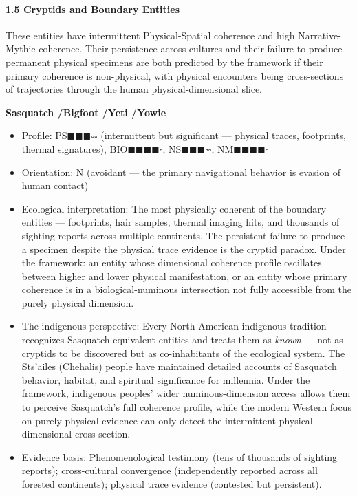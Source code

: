 \paragraph*{1.5 Cryptids and Boundary Entities}


These entities have intermittent Physical-Spatial coherence and high Narrative-Mythic coherence. Their persistence across cultures and their failure to produce permanent physical specimens are both predicted by the framework if their primary coherence is non-physical, with physical encounters being cross-sections of trajectories through the human physical-dimensional slice.


\textbf{Sasquatch /\allowbreak  Bigfoot /\allowbreak  Yeti /\allowbreak  Yowie}

\begin{itemize}[nosep,leftmargin=*]
  \item Profile: PS$\blacksquare$$\blacksquare$$\blacksquare$$\square$$\square$ (intermittent but significant — physical traces, footprints, thermal signatures), BIO$\blacksquare$$\blacksquare$$\blacksquare$$\blacksquare$$\square$, NS$\blacksquare$$\blacksquare$$\blacksquare$$\square$$\square$, NM$\blacksquare$$\blacksquare$$\blacksquare$$\blacksquare$$\square$
  \item Orientation: N (avoidant — the primary navigational behavior is evasion of human contact)
  \item Ecological interpretation: The most physically coherent of the boundary entities — footprints, hair samples, thermal imaging hits, and thousands of sighting reports across multiple continents. The persistent failure to produce a specimen despite the physical trace evidence is the cryptid paradox. Under the framework: an entity whose dimensional coherence profile oscillates between higher and lower physical manifestation, or an entity whose primary coherence is in a biological-numinous intersection not fully accessible from the purely physical dimension.
  \item The indigenous perspective: Every North American indigenous tradition recognizes Sasquatch-equivalent entities and treats them as \textit{known} — not as cryptids to be discovered but as co-inhabitants of the ecological system. The Sts'ailes (Chehalis) people have maintained detailed accounts of Sasquatch behavior, habitat, and spiritual significance for millennia. Under the framework, indigenous peoples' wider numinous-dimension access allows them to perceive Sasquatch's full coherence profile, while the modern Western focus on purely physical evidence can only detect the intermittent physical-dimensional cross-section.
  \item Evidence basis: Phenomenological testimony (tens of thousands of sighting reports); cross-cultural convergence (independently reported across all forested continents); physical trace evidence (contested but persistent).
\end{itemize}


